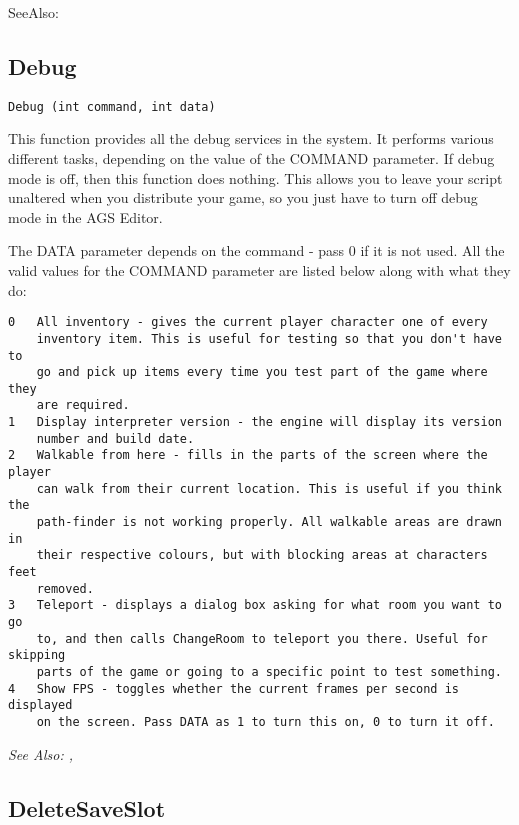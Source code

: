 SeeAlso: 



\subsection{Debug}\label{Debug}%

\begin{verbatim}
Debug (int command, int data)
\end{verbatim}
This function provides all the debug services in the system. It performs
various different tasks, depending on the value of the COMMAND parameter.
If debug mode is off, then this function does nothing. This allows you to
leave your script unaltered when you distribute your game, so you just have
to turn off debug mode in the AGS Editor.

The DATA parameter depends on the command - pass 0 if it is not used.
All the valid values for the COMMAND parameter are listed below along with
what they do:
\begin{verbatim}
0   All inventory - gives the current player character one of every
    inventory item. This is useful for testing so that you don't have to
    go and pick up items every time you test part of the game where they
    are required.
1   Display interpreter version - the engine will display its version
    number and build date.
2   Walkable from here - fills in the parts of the screen where the player
    can walk from their current location. This is useful if you think the
    path-finder is not working properly. All walkable areas are drawn in
    their respective colours, but with blocking areas at characters feet
    removed.
3   Teleport - displays a dialog box asking for what room you want to go
    to, and then calls ChangeRoom to teleport you there. Useful for skipping
    parts of the game or going to a specific point to test something.
4   Show FPS - toggles whether the current frames per second is displayed
    on the screen. Pass DATA as 1 to turn this on, 0 to turn it off.
\end{verbatim}

\it{See Also:} ,


\subsection{DeleteSaveSlot}\label{DeleteSaveSlot}%

